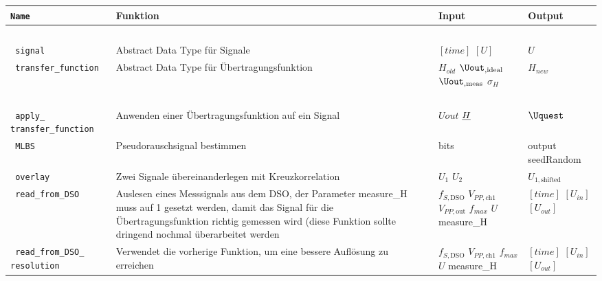 \documentclass[../Report.tex]{subfiles}
\begin{document}
\begin{table}[H]
\centering 
\begin{tabular}[t]{| >{\texttt\bgroup}m{3.5cm}<{\egroup}|m{8cm}|m{2cm}|m{2cm}|} 
  \hline
    \textrm{\textbf{Name}} & \textbf{Funktion} & \textbf{Input} & \textbf{Output} \\ 
  \hline \hline
    \multicolumn{4}{|c|}{classes} \\
  \hline \hline
  signal & Abstract Data Type für Signale & $[time]$ \newline $[U]$  & $U$\\
  \hline
  transfer\_function & Abstract Data Type für Übertragungsfunktion & $H_{old}$ \newline $\Uout_{,\textrm{ideal}}$ \newline $\Uout_{,\textrm{meas}}$ \newline $\sigma_H$ & $H_{new}$\\
  \hline \hline
    \multicolumn{4}{|c|}{helpers} \\
  \hline \hline
  apply\_ \newline transfer\_function & Anwenden einer Übertragungsfunktion auf ein Signal & $Uout$ \newline $\underline{H}$  & $\Uquest$\\
  \hline
  MLBS & Pseudorauschsignal bestimmen & bits & output \newline seedRandom\\
  \hline
  overlay & Zwei Signale übereinanderlegen mit Kreuzkorrelation & $U_1$ \newline $U_2$ & $U_{1,\textrm{shifted}}$\\
  \hline
  read\_from\_DSO & Auslesen eines Messsignals aus dem DSO, der Parameter measure\_H muss auf 1 gesetzt werden, damit das Signal für die Übertragungsfunktion richtig gemessen wird (diese Funktion sollte dringend nochmal überarbeitet werden & $f_{S,\textrm{DSO}}$ \newline $V_{PP,\textrm{ch1}}$ \newline $V_{PP,\textrm{out}}$ \newline $f_{max}$ \newline $U$ \newline measure\_H & $[time]$ \newline $[U_{in}]$ \newline $[U_{out}]$\\
  \hline
  read\_from\_DSO\_ \newline resolution & Verwendet die vorherige Funktion, um eine bessere Auflösung zu erreichen & $f_{S,\textrm{DSO}}$ \newline $V_{PP,\textrm{ch1}}$ \newline $f_{max}$ \newline $U$ \newline measure\_H & $[time]$ \newline $[U_{in}]$ \newline $[U_{out}]$\\

\end{tabular}
\end{table}
\end{document}
